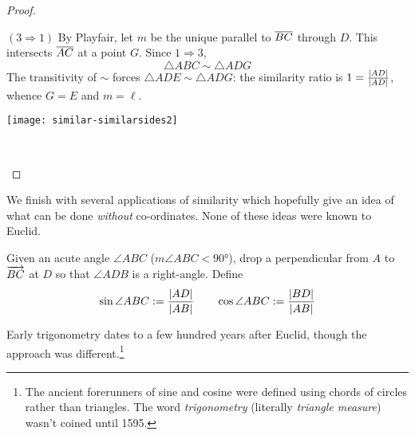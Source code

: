 \begin{proof}
\begin{description}
		\begin{minipage}[t]{0.6\linewidth}\vspace{-5pt}
			\item[$(3\Rightarrow 1)$]\quad By Playfair, let $m$ be the unique parallel to $\overline{BC}$ through $D$. This intersects $\overline{AC}$ at a point $G$. Since $1\Rightarrow 3$,
			\[
				\triangle ABC\sim\triangle ADG
			\]
			The transitivity of $\sim$ forces $\triangle ADE\sim\triangle ADG$: the similarity ratio is $1=\frac{\left| AD\right|}{\left| AD\right|}$, whence $G=E$ and $m=\ell$.
		\end{minipage}
		\hfill
		\begin{minipage}[t]{0.39\linewidth}\vspace{-8pt}
			\flushright
			\texttt{[image: similar-similarsides2]}
		\end{minipage}\\
		\hfill\qedhere
	\end{description}
\end{proof}




\goodbreak




We finish with several applications of similarity which hopefully give an idea of what can be done \emph{without} co-ordinates. None of these ideas were known to Euclid.

\begin{defn}{}{}
	Given an acute angle $\angle ABC$ ($m\angle ABC<\ang{90}$), drop a perpendicular from $A$ to $\overrightarrow{BC}$ at $D$ so that $\angle ADB$ is a right-angle. Define
	\[
		\sin\angle ABC:=\frac{\left| AD\right|}{\left| AB\right|}\qquad \cos\angle ABC:=\frac{\left| BD\right|}{\left| AB\right|}
	\]
\end{defn}

Early trigonometry dates to a few hundred years after Euclid, though the approach was different.\footnote{The ancient forerunners of sine and cosine were defined using chords of circles rather than triangles. The word \emph{trigonometry} (literally \emph{triangle measure}) wasn't coined until 1595.}


